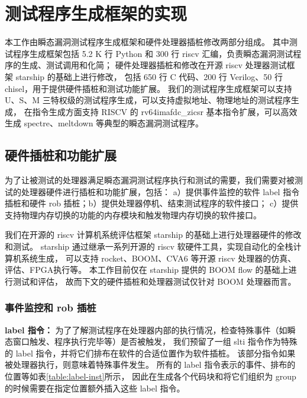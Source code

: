 \section{测试程序生成框架的实现}

本工作由瞬态漏洞测试程序生成框架和硬件处理器插桩修改两部分组成。
其中测试程序生成框架包括 5.2 K 行 Python 和 300 行 riscv 汇编，负责瞬态漏洞测试程序的生成、测试调用和化简；
硬件处理器插桩和修改在开源 riscv 处理器测试框架 starship\cite{starship} 的基础上进行修改，
包括 650 行 C 代码、200 行 Verilog、50 行 chisel，用于提供硬件插桩和测试功能扩展。
我们的测试程序生成框架可以支持 U、S、M 三特权级的测试程序生成，可以支持虚拟地址、物理地址的测试程序生成，
在指令生成方面支持 RISCV 的 rv64imafdc\_zicsr 基本指令扩展，可以高效生成 spectre、meltdown 等典型的瞬态漏洞测试程序。\par

\subsection{硬件插桩和功能扩展}

为了让被测试的处理器满足瞬态漏洞测试程序执行和测试的需要，我们需要对被测试的处理器硬件进行插桩和功能扩展，包括：
a）提供事件监控的软件 label 指令插桩和硬件 rob 插桩；b）提供处理器停机、结束测试程序的软件接口；
c）提供支持物理内存切换的功能的内存模块和触发物理内存切换的软件接口。\par

我们在开源的 riscv 计算机系统评估框架 starship 的基础上进行处理器硬件的修改和测试。
starship 通过继承一系列开源的 riscv 软硬件工具，实现自动化的全栈计算机系统生成，
可以支持 rocket、BOOM、CVA6 等开源 riscv 处理器的仿真、评估、FPGA执行等。
本工作目前仅在 starship 提供的 BOOM flow 的基础上进行测试和评估，
故而下文的硬件插桩和处理器测试仅针对 BOOM 处理器而言。\par

\subsubsection{事件监控和 rob 插桩}
\textbf{label 指令：}
为了了解测试程序在处理器内部的执行情况，检查特殊事件（如瞬态窗口触发、程序执行完毕等）是否被触发，
我们预留了一组 slti 指令作为特殊的 label 指令，并将它们排布在软件的合适位置作为软件插桩。
该部分指令如果被处理器执行，则意味着特殊事件发生。
所有的 label 指令表示的事件、排布的位置等如表\ref{table:label-inst}所示，
因此在生成各个代码块和将它们组织为 group 的时候需要在指定位置额外插入这些 label 指令。\par

